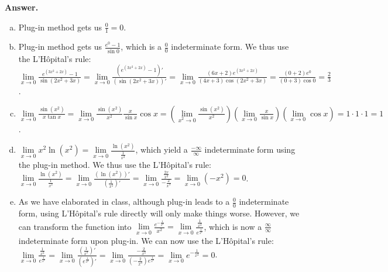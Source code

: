 \documentclass[11pt,letterpaper]{article}
\newcounter{problem}
\newcommand{\problem}{
	\stepcounter{problem}%
	\noindent \textbf{Problem \theproblem. }%
}
\newcommand{\answer}{\noindent \textbf{Answer. }}
\begin{document}
\answer

\begin{enumerate}[(a)]
    \item Plug-in method gets us $\frac{0}{1} = 0$.
    \item Plug-in method gets us $\frac{e^0-1}{\sin 0}$, which is a $\frac{0}{0}$ indeterminate form.  We thus use the L'Hôpital's rule: $\lim\limits_{x \to 0} \frac{e^{(3x^2+2x)}-1}{\sin(2x^2+3x)} = \lim\limits_{x \to 0} \frac{(e^{(3x^2+2x)}-1)'}{(\sin(2x^2+3x))'} = \lim\limits_{x \to 0} \frac{(6x+2)e^{(3x^2+2x)}}{(4x+3)\cos(2x^2+3x)} = \frac{(0+2)e^0}{(0+3)\cos 0} = \frac{2}{3}$.
    \item $\lim\limits_{x \to 0} \frac{\sin (x^2)}{x \tan x}  = \lim\limits_{x \to 0} \frac{\sin (x^2)}{x^2}\frac{x}{\sin x}\cos x = \left(\lim\limits_{x^2 \to 0} \frac{\sin (x^2)}{x^2}\right)\left(\lim\limits_{x \to 0} \frac{x}{\sin x}\right)\left(\lim\limits_{x \to 0} \cos x\right) = 1 \cdot 1 \cdot 1 = 1$.
    \item $\lim\limits_{x \to 0} x^2 \ln (x^2) = \lim\limits_{x \to 0} \frac{\ln(x^2)}{\frac{1}{x^2}}$, which yield a $\frac{-\infty}{\infty}$ indeterminate form using the plug-in method.  We thus use the L'Hôpital's rule: $\lim\limits_{x \to 0} \frac{\ln(x^2)}{\frac{1}{x^2}} = \lim\limits_{x \to 0} \frac{(\ln(x^2))'}{(\frac{1}{x^2})'} = \lim\limits_{x \to 0} \frac{\frac{2x}{x^2}}{-\frac{2}{x^3}} = \lim\limits_{x \to 0} (-x^2) = 0$.
    \item As we have elaborated in class, although plug-in leads to a $\frac{0}{0}$ indeterminate form, using L'Hôpital's rule directly will only make things worse.  However, we can transform the function into $\lim\limits_{x \to 0} \frac{e^{-\frac{1}{x^2}}}{x^2} = \lim\limits_{x \to 0} \frac{\frac{1}{x^2}}{e^{\frac{1}{x^2}}}$, which is now a $\frac{\infty}{\infty}$ indeterminate form upon plug-in.  We can now use the L'Hôpital's rule: $\lim\limits_{x \to 0} \frac{\frac{1}{x^2}}{e^{\frac{1}{x^2}}} = \lim\limits_{x \to 0} \frac{(\frac{1}{x^2})'}{(e^{\frac{1}{x^2}})'} = \lim\limits_{x \to 0} \frac{-\frac{2}{x^3}}{(-\frac{2}{x^3})e^{\frac{1}{x^2}}} = \lim\limits_{x \to 0} e^{-\frac{1}{x^2}} = 0$.
\end{enumerate}\vspace{4mm}

\end{document}
